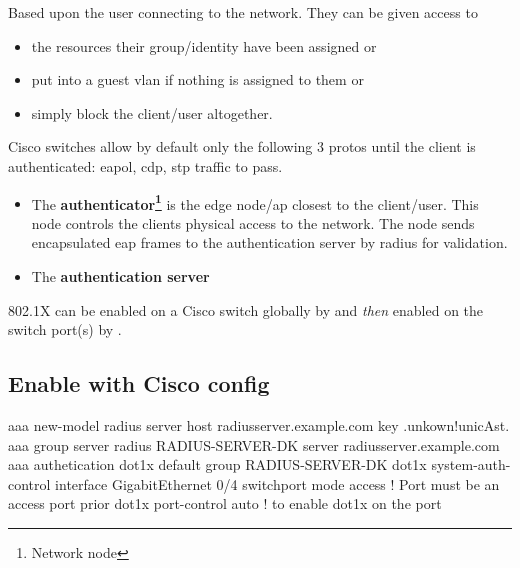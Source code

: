 
Based upon the user connecting to the network. They can be given access to
\begin{itemize}
    \item the resources their group/identity have been assigned or
    \item put into a guest \gls{vlan} if nothing is assigned to them or
    \item simply block the client/user altogether.
\end{itemize}

Cisco switches allow by default only the following 3 protos until the client is authenticated: \gls{eapol}, \gls{cdp}, \gls{stp} traffic to pass.

\begin{itemize}
	\item The \textbf{authenticator\footnote{Network node}} is the edge node/\gls{ap} closest to the client/user. This node controls the clients physical access to the network. The node sends encapsulated \gls{eap} frames to the authentication server by radius for validation.
	\item The \textbf{authentication server}
\end{itemize}


802.1X can be enabled on a Cisco switch globally by  and \textit{then} enabled on the switch port{\footnotesize (s)} by .

\clearpage

\subsection*{Enable with Cisco config}

\begin{txt}
aaa new-model
radius server host radiusserver.example.com key .unkown!unicAst.
aaa group server radius RADIUS-SERVER-DK
 server radiusserver.example.com
aaa authetication dot1x default group RADIUS-SERVER-DK
dot1x system-auth-control
interface GigabitEthernet 0/4
 switchport mode access         ! Port must be an access port prior
 dot1x port-control auto        ! to enable dot1x on the port
\end{txt}
